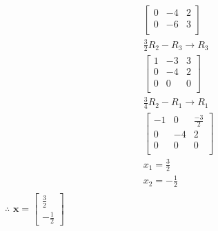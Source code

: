 \documentclass[12pt letter]{report}
\begin{document}
{{\begin{enumerate}
\begin{align*}
\begin{bmatrix}
                0 & -4 & 2 \\
                0 & -6 & 3 \\
              \end{bmatrix}
              \\
              \frac{3}{2}R_2 - R_3  \rightarrow R_3                                                               \\
              \begin{bmatrix}
                1 & -3 & 3 \\
                0 & -4 & 2 \\
                0 & 0  & 0 \\
              \end{bmatrix}
              \\
              \frac{3}{4}R_2 - R_1  \rightarrow R_1                                                               \\
              \begin{bmatrix}
                -1 & 0  & \frac{-3}{2} \\
                0  & -4 & 2            \\
                0  & 0  & 0            \\
              \end{bmatrix}
              \\
              x_1 = \frac{3}{2}                                                                                   \\
              x_2 = -\frac{1}{2}                                                                                  \\
            \end{align*}
            $\therefore$ $\mathbf{x} = \begin{bmatrix}
                \frac{3}{2} \\
                -\frac{1}{2}
              \end{bmatrix} $


\end{enumerate}}}
\end{document}
